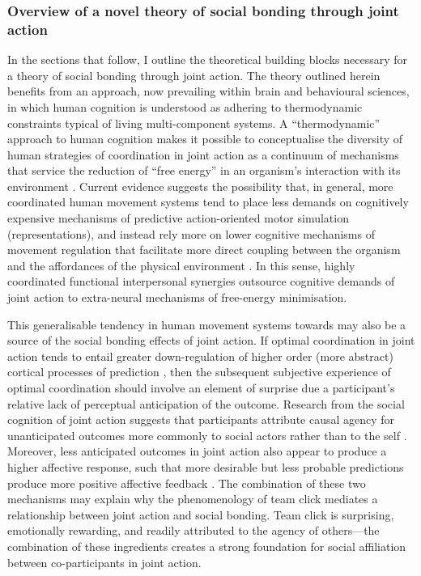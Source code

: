 \begin{CJK}{UTF8}{gbsn}
\subsubsection{Overview of a novel theory of social bonding through joint action}

In the sections that follow, I outline the theoretical building blocks necessary for a theory of social bonding through joint action.  The theory outlined herein benefits from an approach, now prevailing within brain and behavioural sciences, in which human cognition is understood as adhering to thermodynamic constraints typical of living multi-component systems.  A ``thermodynamic'' approach to human cognition makes it possible to conceptualise the diversity of human strategies of coordination in joint action as a continuum of mechanisms that service the reduction of ``free energy'' in an organism's interaction with its environment \citep{Friston2010,Yufik2013,Yufik2017}.  Current evidence suggests the possibility that, in general, more coordinated human movement systems tend to place less demands on cognitively expensive mechanisms of predictive action-oriented motor simulation (representations), and instead rely more on lower cognitive mechanisms of movement regulation that facilitate more direct coupling between the organism and the affordances of the physical environment \citep{Bourbousson2011,RKiouak2016}.  In this sense, highly coordinated functional interpersonal synergies outsource cognitive demands of joint action to extra-neural mechanisms of free-energy minimisation.

This generalisable tendency in human movement systems towards  may also be a source of the social bonding effects of joint action.  If optimal coordination in joint action tends to entail greater down-regulation of higher order (more abstract) cortical processes of prediction \citep{Dietrich2004b}, then the subsequent subjective experience of optimal coordination should involve an element of surprise due a participant's relative lack of perceptual anticipation of the outcome.  Research from the social cognition of joint action suggests that participants attribute causal agency for unanticipated outcomes more commonly to social actors rather than to the self \citep{Sato2008}.  Moreover, less anticipated outcomes in joint action also appear to produce a higher affective response, such that more desirable but less probable predictions produce more positive affective feedback \citep{Chetverikov2016}.  The combination of these two mechanisms may explain why the phenomenology of team click mediates a relationship between joint action and social bonding.  Team click is surprising, emotionally rewarding, and readily attributed to the agency of others---the combination of these ingredients creates a strong foundation for social affiliation between co-participants in joint action.


\end{CJK}
